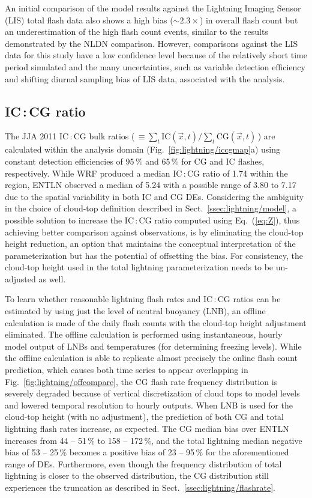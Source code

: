 An initial comparison of the model results against the Lightning Imaging
Sensor (LIS) total flash data also shows a high bias ($\sim2.3\times$) in
overall flash count but an underestimation of the high flash count events,
similar to the results demonstrated by the NLDN comparison. However,
comparisons against the LIS data for this study have a low confidence level
because of the relatively short time period simulated and the many
uncertainties, such as variable detection efficiency and shifting diurnal
sampling bias of LIS data, associated with the analysis.

\subsection{IC\,:\,CG ratio}\label{ssec:lightning/ratio}

The JJA 2011 IC\,:\,CG bulk ratios (\,$\equiv\sum_t \textrm{IC}(\vec{x},t)/\sum_t
\textrm{CG}(\vec{x},t)$\,) are calculated within the analysis domain
(Fig.~\ref{fig:lightning/iccgmap}a) using constant detection efficiencies of 95\,{\%}
and 65\,{\%} for CG and IC flashes, respectively. While WRF produced a median
IC\,:\,CG ratio of 1.74 within the region, ENTLN observed a median of 5.24
with a possible range of 3.80 to 7.17 due to the spatial variability in both
IC and CG DEs. Considering the ambiguity in the choice of cloud-top
definition described in Sect.~\ref{ssec:lightning/model}, a possible solution to
increase the IC\,:\,CG ratio computed using Eq.~(\ref{eq:Z}), thus achieving
better comparison against observations, is by eliminating the cloud-top
height reduction, an option that maintains the conceptual interpretation of
the parameterization but has the potential of offsetting the bias. For
consistency, the cloud-top height used in the total lightning
parameterization needs to be un-adjusted as well.

To learn whether reasonable lightning flash rates and IC\,:\,CG ratios can be
estimated by using just the level of neutral buoyancy (LNB), an offline
calculation is made of the daily flash counts with the cloud-top height
adjustment eliminated. The offline calculation is performed using
instantaneous, hourly model output of LNBs and temperatures (for determining
freezing levels). While the offline calculation is able to replicate almost
precisely the online flash count prediction, which causes both time series to
appear overlapping in Fig.~\ref{fig:lightning/offcompare}, the CG flash rate
frequency distribution is severely degraded because of vertical
discretization of cloud tops to model levels and lowered temporal resolution
to hourly outputs. When LNB is used for the cloud-top height (with no
adjustment), the prediction of both CG and total lightning flash rates
increase, as expected. The CG median bias over ENTLN increases from 44 --
51\,{\%} to 158 -- 172\,{\%}, and the total lightning median negative bias of
53 -- 25\,{\%} becomes a positive bias of 23 -- 95\,{\%} for the
aforementioned range of DEs. Furthermore, even though the frequency
distribution of total lightning is closer to the observed distribution, the
CG distribution still experiences the truncation as described in
Sect.~\ref{ssec:lightning/flashrate}.

